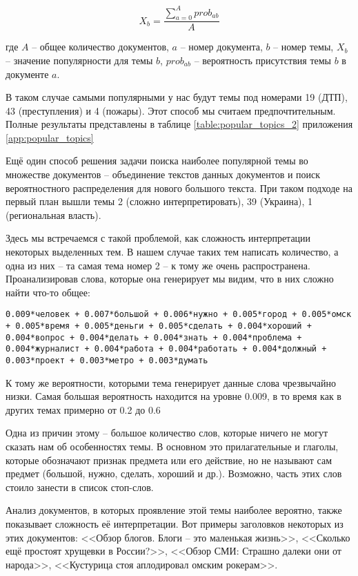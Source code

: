 \begin{equation}\label{eq:popular_topics}
X_b = \frac{\sum_{a=0}^{A} prob_{ab}}{A}
\end{equation}

где $A$ -- общее количество документов, $a$ -- номер документа, $b$ -- номер темы, $X_b$ -- значение популярности для темы $b$, $prob_{ab}$ -- вероятность присутствия темы $b$ в документе $a$.

В таком случае самыми популярными у нас будут темы под номерами 19 (ДТП), 43 (преступления) и 4 (пожары). Этот способ мы считаем предпочтительным. Полные результаты представлены в таблице \ref{table:popular_topics_2} приложения \ref{app:popular_topics}

Ещё один способ решения задачи поиска наиболее популярной темы во множестве документов -- объединение текстов данных документов и поиск вероятностного распределения для нового большого текста. При таком подходе на первый план вышли темы 2 (сложно интерпретировать), 39 (Украина), 1 (региональная власть).

Здесь мы встречаемся с такой проблемой, как сложность интерпретации некоторых выделенных тем. В нашем случае таких тем {написать количество}, а одна из них -- та самая тема номер 2 -- к тому же очень распространена. Проанализировав слова, которые она генерирует мы видим, что в них сложно найти что-то общее:

\texttt{0.009*человек + 0.007*большой + 0.006*нужно + 0.005*город + 0.005*омск + 0.005*время + 0.005*деньги + 0.005*сделать + 0.004*хороший + 0.004*вопрос + 0.004*делать + 0.004*знать + 0.004*проблема + 0.004*журналист + 0.004*работа + 0.004*работать + 0.004*должный + 0.003*проект + 0.003*метро + 0.003*думать}

К тому же вероятности, которыми тема генерирует данные слова чрезвычайно низки. Самая большая вероятность находится на уровне 0.009, в то время как в других темах примерно от 0.2 до 0.6

Одна из причин этому -- большое количество слов, которые ничего не могут сказать нам об особенностях темы. В основном это прилагательные и глаголы, которые обозначают признак предмета или его действие, но не называют сам предмет (большой, нужно, сделать, хороший и др.). Возможно, часть этих слов стоило занести в список стоп-слов.

Анализ документов, в которых проявление этой темы наиболее вероятно, также показывает сложность её интерпретации. Вот примеры заголовков некоторых из этих документов: <<Обзор блогов. Блоги – это маленькая жизнь>>, <<Сколько ещё простоят хрущевки в России?>>, <<Обзор СМИ: Страшно далеки они от народа>>, <<Кустурица стоя аплодировал омским рокерам>>.

